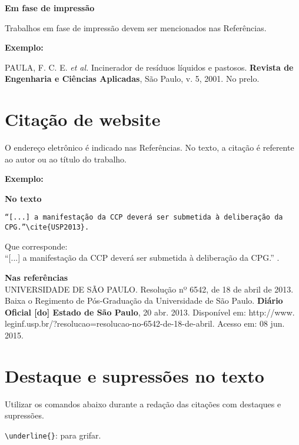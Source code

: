\textbf{Em fase de impressão}

Trabalhos em fase de impressão devem ser mencionados nas Referências.

\textbf{Exemplo:}

\begin{alineas}
	\item
PAULA, F. C. E. \textit{et al.} Incinerador de resíduos líquidos e pastosos. \textbf{Revista de
Engenharia e Ciências Aplicadas}, São Paulo, v. 5, 2001. No prelo.
\end{alineas}


\section{Citação de website}

O endereço eletrônico é indicado nas Referências. No texto, a citação é referente ao autor ou ao título do trabalho. 

\textbf{Exemplo:}

\begin{alineas}
\item
\textbf{No texto}
\begin{verbatim}
“[...] a manifestação da CCP deverá ser submetida à deliberação da
CPG.”\cite{USP2013}.
\end{verbatim}
Que corresponde:\\
“[...] a manifestação da CCP deverá ser submetida à deliberação da
CPG.” \cite{USP2013}. \\

\item 
\textbf{Nas referências}\\

UNIVERSIDADE DE SÃO PAULO. Resolução nº 6542, de 18 de abril de 2013.
Baixa o Regimento de Pós-Graduação da Universidade de São Paulo. \textbf{Diário
Oficial [do] Estado de São Paulo}, 20 abr. 2013. Disponível em: http://www.
leginf.usp.br/?resolucao=resolucao-no-6542-de-18-de-abril. Acesso em: 08 jun.
2015.
\end{alineas}

\section{Destaque e supressões no texto}

Utilizar os comandos abaixo durante a redação das citações com destaques e supressões.

\verb+\underline{}+: para grifar.

